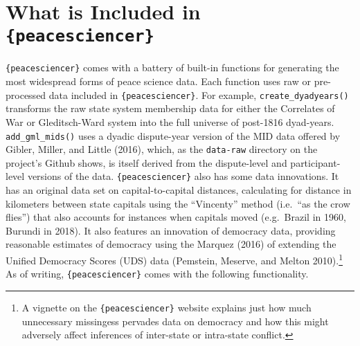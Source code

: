 \documentclass[
  11pt,
]{article}
\begin{document}
\hypertarget{what-is-included-in-peacesciencer}{%
\section{\texorpdfstring{What is Included in \texttt{\{peacesciencer\}}}{What is Included in \{peacesciencer\}}}\label{what-is-included-in-peacesciencer}}

\texttt{\{peacesciencer\}} comes with a battery of built-in functions for generating the most widespread forms of peace science data. Each function uses raw or pre-processed data included in \texttt{\{peacesciencer\}}. For example, \texttt{create\_dyadyears()} transforms the raw state system membership data for either the Correlates of War or Gleditsch-Ward system into the full universe of post-1816 dyad-years. \texttt{add\_gml\_mids()} uses a dyadic dispute-year version of the MID data offered by Gibler, Miller, and Little (2016), which, as the \texttt{data-raw} directory on the project's Github shows, is itself derived from the dispute-level and participant-level versions of the data. \texttt{\{peacesciencer\}} also has some data innovations. It has an original data set on capital-to-capital distances, calculating for distance in kilometers between state capitals using the ``Vincenty'' method (i.e.~``as the crow flies'') that also accounts for instances when capitals moved (e.g.~Brazil in 1960, Burundi in 2018). It also features an innovation of democracy data, providing reasonable estimates of democracy using the Marquez (2016) of extending the Unified Democracy Scores (UDS) data (Pemstein, Meserve, and Melton 2010).\footnote{A vignette on the \texttt{\{peacesciencer\}} website explains just how much unnecessary missingess pervades data on democracy and how this might adversely affect inferences of inter-state or intra-state conflict.} As of writing, \texttt{\{peacesciencer\}} comes with the following functionality.

\begingroup\fontsize{7}{9}\selectfont
\end{document}
